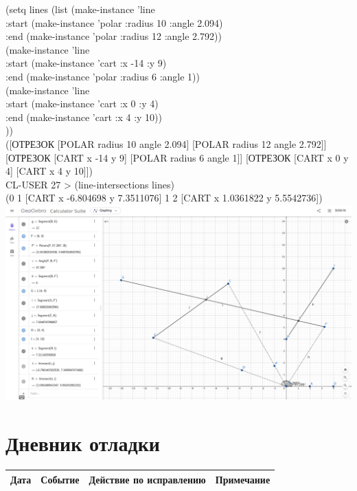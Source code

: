 \documentclass[12pt]{article}
\begin{document}
{(setq lines (list (make-instance 'line \\
                   :start (make-instance 'polar :radius 10 :angle 2.094) \\
                   :end (make-instance 'polar :radius 12 :angle 2.792)) \\
					(make-instance 'line \\
                   :start (make-instance 'cart :x -14 :y 9) \\
                   :end (make-instance 'polar :radius 6 :angle 1)) \\
					(make-instance 'line \\ 
                   :start (make-instance 'cart :x 0 :y 4) \\
                   :end (make-instance 'cart :x 4 :y 10)) \\
					)) \\
([ОТРЕЗОК [POLAR radius 10 angle 2.094] [POLAR radius 12 angle 2.792]] [ОТРЕЗОК [CART x -14 y 9] [POLAR radius 6 angle 1]] [ОТРЕЗОК [CART x 0 y 4] [CART x 4 y 10]]) \\

CL-USER 27 > 
(line-intersections lines) \\
(0 1 [CART x -6.804698 y 7.3511076] 1 2 [CART x 1.0361822 y 5.5542736]) \\

\includegraphics[scale=0.25]{2.png}

}

\section{Дневник отладки}
\begin{tabular}{|c|c|c|c|}
\hline
Дата & Событие & Действие по исправлению & Примечание \\
\hline
\end{tabular}
\end{document}
